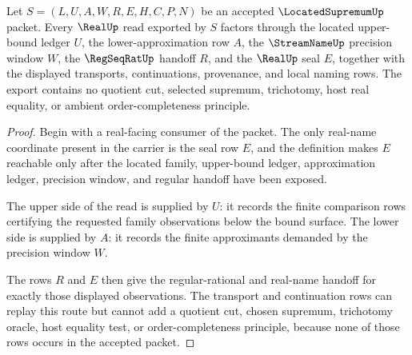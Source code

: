 
\begin{theorem}
\label{thm:located-supremum-real-seal-boundary}
Let $S=(L,U,A,W,R,E,H,C,P,N)$ be an accepted $\LocatedSupremumUp$ packet. Every $\RealUp$ read exported by $S$ factors through the located upper-bound ledger $U$, the lower-approximation row $A$, the $\StreamNameUp$ precision window $W$, the $\RegSeqRatUp$ handoff $R$, and the $\RealUp$ seal $E$, together with the displayed transports, continuations, provenance, and local naming rows. The export contains no quotient cut, selected supremum, trichotomy, host real equality, or ambient order-completeness principle.
\end{theorem}
\begin{proof}
Begin with a real-facing consumer of the packet. The only real-name coordinate present in the carrier is the seal row $E$, and the definition makes $E$ reachable only after the located family, upper-bound ledger, approximation ledger, precision window, and regular handoff have been exposed.

The upper side of the read is supplied by $U$: it records the finite comparison rows certifying the requested family observations below the bound surface. The lower side is supplied by $A$: it records the finite approximants demanded by the precision window $W$.

The rows $R$ and $E$ then give the regular-rational and real-name handoff for exactly those displayed observations. The transport and continuation rows can replay this route but cannot add a quotient cut, chosen supremum, trichotomy oracle, host equality test, or order-completeness principle, because none of those rows occurs in the accepted packet.
\end{proof}

